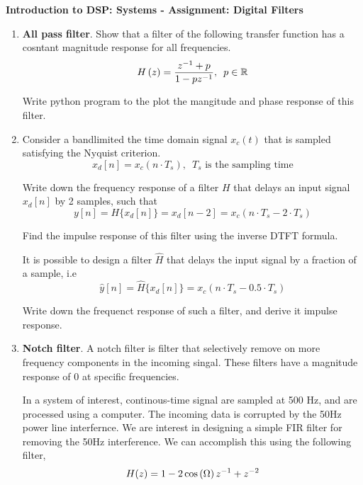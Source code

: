 \documentclass[9pt]{article}
\def\mb{\ensuremath\mathbb}
\def\lp{\ensuremath\left(}
\def\rp{\ensuremath\right)}
\begin{document}
\begin{center}
    \begin{Large}
        \textbf{Introduction to DSP: Systems - Assignment: Digital Filters}
    \end{Large}
\end{center}
\vspace{0.2cm}

\begin{multicols}{2}
    \begin{enumerate}
        \item \textbf{All pass filter}. Show that a filter of the following transfer function has a cosntant magnitude response for all frequencies.
        \[ H\lp z \rp = \frac{z^{-1} + p}{1 - pz^{-1}}, \,\,\, p \in \mb{R} \]

        Write python program to the plot the mangitude and phase response of this filter.
        
        \item Consider a bandlimited the time domain signal $x_c(t)$ that is sampled satisfying the Nyquist criterion. 
        \[  x_d[n] = x_c(n\cdot T_s), \,\,\, T_s \text{ is the sampling time} \]

        Write down the frequency response of a filter $H$ that delays an input signal $x_d[n]$ by 2 samples, such that
        \[ y[n] = H\{ x_d[n] \} = x_d[n - 2] = x_c(n\cdot T_s - 2\cdot T_s) \]

        Find the impulse response of this filter using the inverse DTFT formula.

        It is possible to design a filter $\hat{H}$ that delays the input signal by a fraction of a sample, i.e
        \[ \hat{y}[n] = \hat{H}\{ x_d[n] \} = x_c(n\cdot T_s - 0.5 \cdot T_s) \]

        Write down the frequenct response of such a filter, and derive it impulse response.

        \item \textbf{Notch filter}. A notch filter is filter that selectively remove on more frequency components in the incoming singal. These filters have a magnitude response of $0$ at specific frequencies.

        In a system of interest, continous-time signal are sampled at 500 Hz, and are processed using a computer. The incoming data is corrupted by the 50Hz power line interfernce. We are interest in designing a simple FIR filter for removing the 50Hz interference. We can accomplish this using the following filter,
        \[ H(z) = 1 - 2\cos\lp \Omega \rp z^{-1} + z^{-2} \]


\end{enumerate}
\end{multicols}
\end{document}
